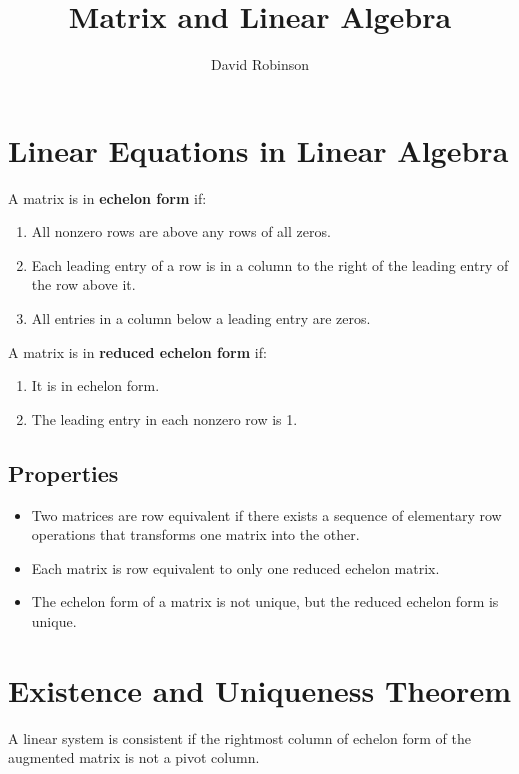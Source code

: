 \documentclass{article}
\title{Matrix and Linear Algebra}
\author{David Robinson}
\date{}
\begin{document}
\maketitle

\section*{Linear Equations in Linear Algebra}

A matrix is in \textbf{echelon form} if:
\begin{enumerate}
    \item All nonzero rows are above any rows of all zeros.
    \item Each leading entry of a row is in a column to the right of the leading entry of the row
    above it.
    \item All entries in a column below a leading entry are zeros.
\end{enumerate}

\noindent
A matrix is in \textbf{reduced echelon form} if:
\begin{enumerate}
    \item It is in echelon form.
    \item The leading entry in each nonzero row is 1.
\end{enumerate}

\subsection*{Properties}
\begin{itemize}
    \item Two matrices are row equivalent if there exists a sequence of elementary row operations
    that transforms one matrix into the other.
    \item Each matrix is row equivalent to only one reduced echelon matrix.
    \item The echelon form of a matrix is not unique, but the reduced echelon form is unique.
\end{itemize}

\section*{Existence and Uniqueness Theorem}
A linear system is consistent if the rightmost column of echelon form of the augmented matrix is
not a pivot column.
\end{document}
